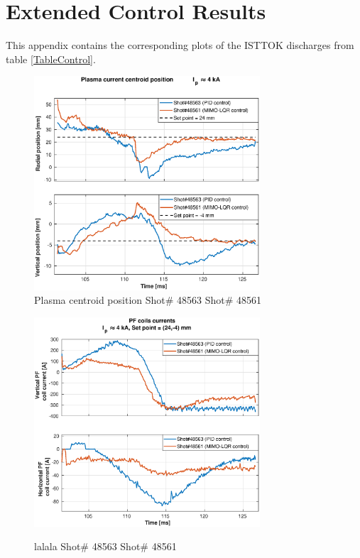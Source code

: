 \chapter{Extended Control Results }

This appendix contains the corresponding plots of the ISTTOK discharges from table \ref{TableControl}.

\begin{figure}[h]
	\centering
	\includegraphics[width=0.75\textwidth]{Chp5/PIDvsMIMO_563_561_2.eps}
	\caption{Plasma centroid position Shot\# 48563 Shot\# 48561}
\end{figure}

\begin{figure}
	\centering
	\includegraphics[width=0.75\textwidth]{Chp5/PIDvsMIMO_563_561_curr_2.eps}
	\label{564_559curr}
	\caption{lalala  Shot\# 48563 Shot\# 48561}
\end{figure}

